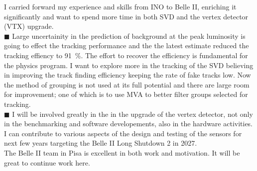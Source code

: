 \documentclass[12pt]{article}
\begin{document}
\begin{justify}
  \hspace*{0.6cm}
  I carried forward my experience and skills from INO to Belle II, enriching it
  significantly and want to spend more time in both SVD and the vertex detector (VTX) upgrade.
  \\
  $\blacksquare$ Large uncertainity in the prediction of background at the peak luminosity is
  going to effect the tracking performance and the the latest estimate reduced the
  tracking effiency to \SI{91}{\%}. The effort to recover the efficiency is fundamental for the
  physics program.
  I want to explore more in the tracking of the SVD believing in improving
  the track finding efficiency keeping the rate of fake tracks low. Now the method of
  grouping is not used at its full potential and there are large room for improvement;
  one of which is to use MVA to better filter groups selected for tracking.
  \\
  $\blacksquare$ I will be involved greatly in the in the upgrade of the vertex detector,
  not only in the benchmarking and software developements, also in the hardware activities.
  I can contribute to various aspects of the design and testing of the sensors for next few
  years targeting the Belle II Long Shutdown 2 in 2027.
  \\
  \hspace*{0.6cm}
  The Belle II team in Pisa is excellent in both work and motivation.
  It will be great to continue work here.

\end{justify}
\end{document}
